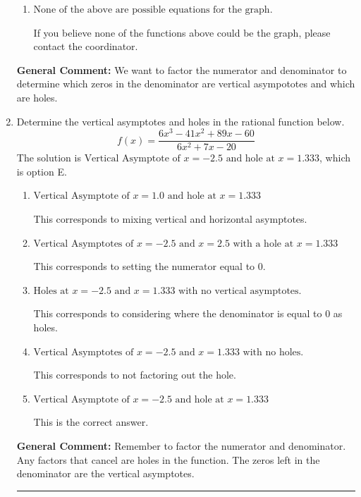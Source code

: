 \documentclass{extbook}[14pt]
\newcommand{\litem}[1]{\item #1

\rule{\textwidth}{0.4pt}}
\begin{document}
\begin{enumerate}
{\begin{enumerate}[label=\Alph*.]
You treated all of the zeros in the denominator as vertical asmptotes when some of them were holes and wrote factors as $x+z$.
\item \( \text{None of the above are possible equations for the graph.} \)

If you believe none of the functions above could be the graph, please contact the coordinator.
\end{enumerate}

\textbf{General Comment:} We want to factor the numerator and denominator to determine which zeros in the denominator are vertical asympototes and which are holes.
}
\litem{
Determine the vertical asymptotes and holes in the rational function below.
\[ f(x) = \frac{6x^{3} -41 x^{2} +89 x -60}{6x^{2} +7 x -20} \]The solution is \( \text{Vertical Asymptote of } x = -2.5 \text{ and hole at } x = 1.333 \), which is option E.\begin{enumerate}[label=\Alph*.]
\item \( \text{Vertical Asymptote of } x = 1.0 \text{ and hole at } x = 1.333 \)

This corresponds to mixing vertical and horizontal asymptotes.
\item \( \text{Vertical Asymptotes of } x = -2.5 \text{ and } x = 2.5 \text{ with a hole at } x = 1.333 \)

This corresponds to setting the numerator equal to 0.
\item \( \text{Holes at } x = -2.5 \text{ and } x = 1.333 \text{ with no vertical asymptotes.} \)

This corresponds to considering where the denominator is equal to 0 as holes.
\item \( \text{Vertical Asymptotes of } x = -2.5 \text{ and } x = 1.333 \text{ with no holes.} \)

This corresponds to not factoring out the hole.
\item \( \text{Vertical Asymptote of } x = -2.5 \text{ and hole at } x = 1.333 \)

This is the correct answer.
\end{enumerate}

\textbf{General Comment:} Remember to factor the numerator and denominator. Any factors that cancel are holes in the function. The zeros left in the denominator are the vertical asymptotes.
}
\end{enumerate}
\end{document}
